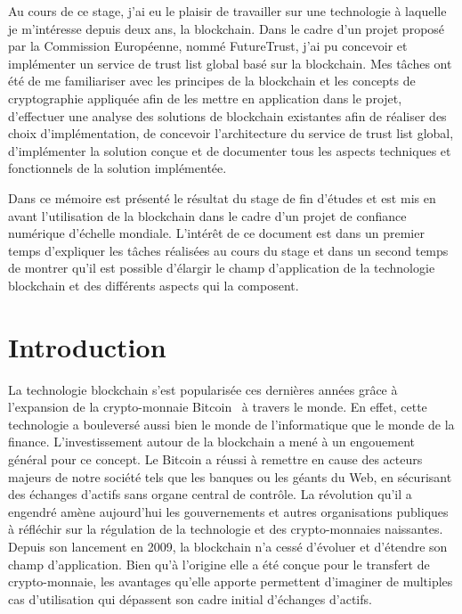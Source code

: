 \documentclass{tnreport}
\begin{document}
Au cours de ce stage, j'ai eu le plaisir de travailler sur une technologie à laquelle je m'intéresse depuis deux ans, la blockchain. Dans le cadre d'un projet proposé par la Commission Européenne, nommé FutureTrust, j'ai pu concevoir et implémenter un service de trust list global basé sur la blockchain. Mes tâches ont été de me familiariser avec les principes de la blockchain et les concepts de cryptographie appliquée afin de les mettre en application dans le projet, d'effectuer une analyse des solutions de blockchain existantes afin de réaliser des choix d'implémentation, de concevoir l'architecture du service de trust list global, d'implémenter la solution conçue et de documenter tous les aspects techniques et fonctionnels de la solution implémentée.

Dans ce mémoire est présenté le résultat du stage de fin d'études et est mis en avant l'utilisation de la blockchain dans le cadre d'un projet de confiance numérique d'échelle mondiale. L'intérêt de ce document est dans un premier temps d'expliquer les tâches réalisées au cours du stage et dans un second temps de montrer qu'il est possible d'élargir le champ d'application de la technologie blockchain et des différents aspects qui la composent.

\cleardoublepage

\renewcommand{\baselinestretch}{0.5}\normalsize
\tableofcontents
\renewcommand{\baselinestretch}{1.0}\normalsize
\cleardoublepage

\setcounter{page}{1}

\chapter{Introduction}

La technologie blockchain s'est popularisée ces dernières années grâce à l'expansion de la crypto-monnaie Bitcoin~\cite{Bitcoin} à travers le monde. 
En effet, cette technologie a bouleversé aussi bien le monde de l'informatique que le monde de la finance. 
L'investissement autour de la blockchain a mené à un engouement général pour ce concept. 
Le Bitcoin a réussi à remettre en cause des acteurs majeurs de notre société tels que les banques ou les géants du Web, en sécurisant des échanges d'actifs sans organe central de contrôle. 
La révolution qu'il a engendré amène aujourd'hui les gouvernements et autres organisations publiques à réfléchir sur la régulation de la technologie et des crypto-monnaies naissantes.
Depuis son lancement en 2009, la blockchain n'a cessé d'évoluer et d'étendre son champ d'application.
Bien qu'à l'origine elle a été conçue pour le transfert de crypto-monnaie, les avantages qu'elle apporte permettent d'imaginer de multiples cas d'utilisation qui dépassent son cadre initial d'échanges d'actifs.
\end{document}
